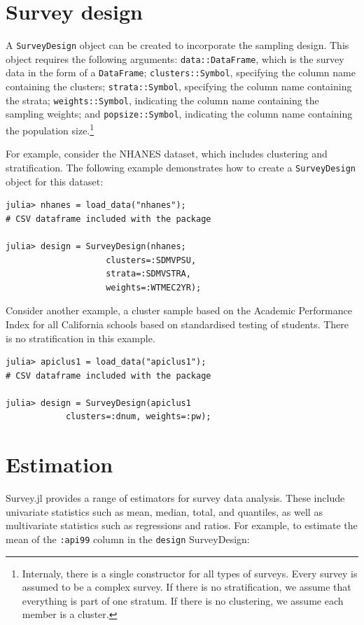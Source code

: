 \documentclass{article}
\begin{document}
\section{Survey design}

A \verb|SurveyDesign| object can be created to incorporate the sampling design. This object requires the following arguments: \verb|data::DataFrame|, which is the survey data in the form of a \verb|DataFrame|; \verb|clusters::Symbol|, specifying the column name containing the clusters; \verb|strata::Symbol|, specifying the column name containing the strata; \verb|weights::Symbol|, indicating the column name containing the sampling weights; and \verb|popsize::Symbol|, indicating the column name containing the population size.\footnote{Internaly, there is a single constructor for all types of surveys. Every survey is assumed to be a complex survey. If there is no stratification, we assume that everything is part of one stratum. If there is no clustering, we assume each member is a cluster.}  

For example, consider the NHANES dataset, which includes clustering and stratification. The following example demonstrates how to create a \verb|SurveyDesign| object for this dataset:
\begin{verbatim}
julia> nhanes = load_data("nhanes"); 
# CSV dataframe included with the package

julia> design = SurveyDesign(nhanes;
                    clusters=:SDMVPSU,
                    strata=:SDMVSTRA, 
                    weights=:WTMEC2YR);
    \end{verbatim}
Consider another example, a cluster sample based on the Academic Performance Index for all California schools based on standardised testing of students. There is no stratification in this example. 

\begin{verbatim}
julia> apiclus1 = load_data("apiclus1"); 
# CSV dataframe included with the package

julia> design = SurveyDesign(apiclus1
            clusters=:dnum, weights=:pw);
    \end{verbatim}

\section{Estimation}

Survey.jl provides a range of estimators for survey data analysis. These include univariate statistics such as mean, median, total, and quantiles, as well as multivariate statistics such as regressions and ratios. For example, to estimate the mean of the \verb|:api99| column in the \verb|design| SurveyDesign:
\end{document}
